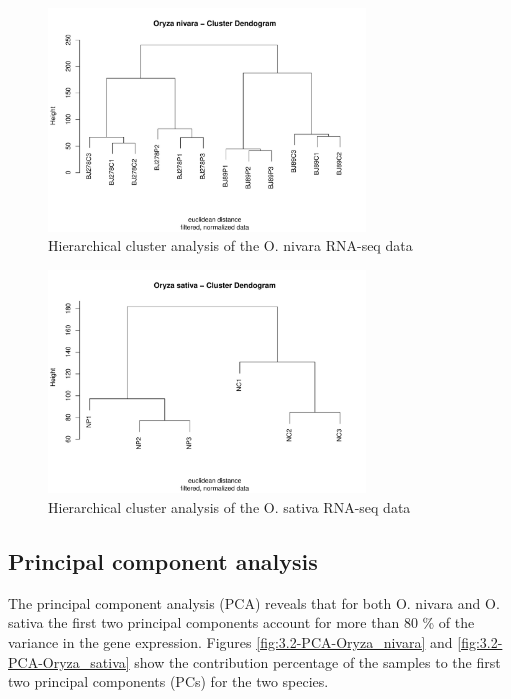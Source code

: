 \begin{figure}[htbp]
    \caption{Hierarchical cluster analysis of the O. nivara RNA-seq data}
    \label{fig:3.1-Clust-Dendrogram-Oryza_nivara}
    \includegraphics[width=0.75\textwidth]{../../results/plots-and-tables/3.1-Clust-Dendrogram-Oryza_nivara}
\end{figure}

\begin{figure}[htbp]
    \caption{Hierarchical cluster analysis of the O. sativa RNA-seq data}
    \label{fig:3.1-Clust-Dendrogram-Oryza_sativa}
    \includegraphics[width=0.75\textwidth]{../../results/plots-and-tables/3.1-Clust-Dendrogram-Oryza_sativa}
\end{figure}


\subsection{Principal component analysis}

The principal component analysis (PCA) reveals that for both O. nivara and O. sativa the first two principal components account for more than 80 \% of the variance in the gene expression. Figures  \ref{fig:3.2-PCA-Oryza_nivara} and \ref{fig:3.2-PCA-Oryza_sativa} show the contribution percentage of the samples to the first two principal components (PCs) for the two species.

